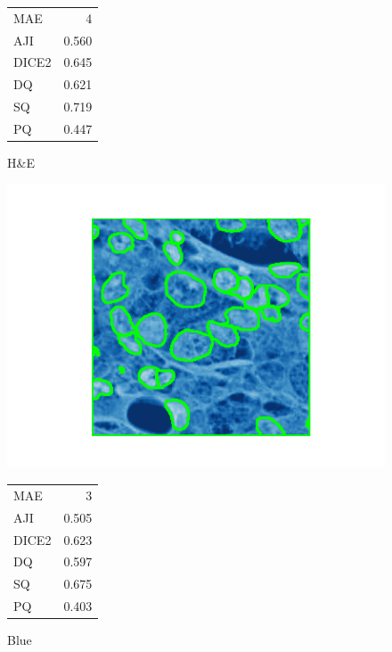 \documentclass[target=bach,aauheader=,style=]{thud}
\begin{document}
\begin{figure}[ht]
\begin{minipage}{0.48\textwidth}
  \footnotesize
  \begin{tabular}{@{}lr@{}}
   MAE & 4\\ AJI & 0.560\\ DICE2 & 0.645\\
   DQ & 0.621\\ SQ & 0.719\\ PQ & 0.447
  \end{tabular}
  \caption*{H\&E}
\end{minipage}

\vspace{0.6em}

\begin{minipage}{0.48\textwidth}\centering
  \includegraphics[width=\linewidth]{imgs/qualitative/medium/Blu/contour_img.png}\\[-1ex]
  \footnotesize
  \begin{tabular}{@{}lr@{}}
   MAE & 3\\ AJI & 0.505\\ DICE2 & 0.623\\
   DQ & 0.597\\ SQ & 0.675\\ PQ & 0.403
  \end{tabular}
  \caption*{Blue}
\end{minipage}\hfill
\begin{minipage}{0.48\textwidth}\centering

\end{minipage}
\end{figure}
\end{document}
